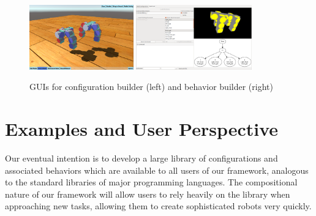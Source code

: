 \documentclass[graybox]{svmult}
\begin{document}
\begin{figure}
\begin{center}
    \includegraphics[height=1.1in]{images/library/unity/config_designer.png}
    \includegraphics[height=1.1in]{images/gait_window.png}
    \caption{GUIs for configuration builder (left) and behavior builder (right)}
    \label{fig:smores_conf}
\end{center}
\end{figure}

%
\section{Examples and User Perspective}
\label{sec:examples}
Our eventual intention is to develop a large library of configurations and associated
behaviors which are available to all users of our framework, analogous to the standard
libraries of major programming languages.  The compositional nature of our framework
will allow users to rely heavily on the library when approaching new tasks, allowing
them to create sophisticated robots very quickly.
\end{document}
